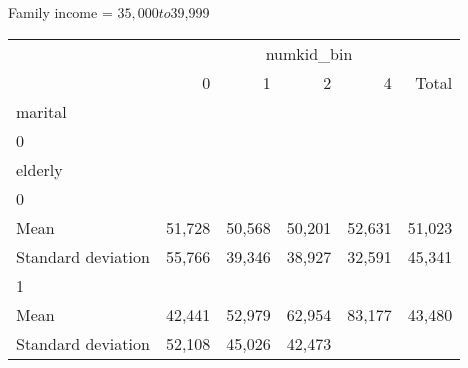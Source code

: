 Family income = $35,000 to $39,999
\begin{tabular}{llllll}
\cline{1-6}
\multicolumn{1}{c}{} &
  \multicolumn{5}{|c}{numkid\_bin} \\
\multicolumn{1}{c}{} &
  \multicolumn{1}{|r}{0} &
  \multicolumn{1}{r}{1} &
  \multicolumn{1}{r}{2} &
  \multicolumn{1}{r}{4} &
  \multicolumn{1}{r}{Total} \\
\cline{1-6}
\multicolumn{1}{l}{marital} &
  \multicolumn{1}{|r}{} &
  \multicolumn{1}{r}{} &
  \multicolumn{1}{r}{} &
  \multicolumn{1}{r}{} &
  \multicolumn{1}{r}{} \\
\multicolumn{1}{l}{\hspace{1em}0} &
  \multicolumn{1}{|r}{} &
  \multicolumn{1}{r}{} &
  \multicolumn{1}{r}{} &
  \multicolumn{1}{r}{} &
  \multicolumn{1}{r}{} \\
\multicolumn{1}{l}{\hspace{2em}elderly} &
  \multicolumn{1}{|r}{} &
  \multicolumn{1}{r}{} &
  \multicolumn{1}{r}{} &
  \multicolumn{1}{r}{} &
  \multicolumn{1}{r}{} \\
\multicolumn{1}{l}{\hspace{3em}0} &
  \multicolumn{1}{|r}{} &
  \multicolumn{1}{r}{} &
  \multicolumn{1}{r}{} &
  \multicolumn{1}{r}{} &
  \multicolumn{1}{r}{} \\
\multicolumn{1}{l}{\hspace{4em}Mean} &
  \multicolumn{1}{|r}{51,728} &
  \multicolumn{1}{r}{50,568} &
  \multicolumn{1}{r}{50,201} &
  \multicolumn{1}{r}{52,631} &
  \multicolumn{1}{r}{51,023} \\
\multicolumn{1}{l}{\hspace{4em}Standard deviation} &
  \multicolumn{1}{|r}{55,766} &
  \multicolumn{1}{r}{39,346} &
  \multicolumn{1}{r}{38,927} &
  \multicolumn{1}{r}{32,591} &
  \multicolumn{1}{r}{45,341} \\
\multicolumn{1}{l}{\hspace{3em}1} &
  \multicolumn{1}{|r}{} &
  \multicolumn{1}{r}{} &
  \multicolumn{1}{r}{} &
  \multicolumn{1}{r}{} &
  \multicolumn{1}{r}{} \\
\multicolumn{1}{l}{\hspace{4em}Mean} &
  \multicolumn{1}{|r}{42,441} &
  \multicolumn{1}{r}{52,979} &
  \multicolumn{1}{r}{62,954} &
  \multicolumn{1}{r}{83,177} &
  \multicolumn{1}{r}{43,480} \\
\multicolumn{1}{l}{\hspace{4em}Standard deviation} &
  \multicolumn{1}{|r}{52,108} &
  \multicolumn{1}{r}{45,026} &
  \multicolumn{1}{r}{42,473} &

\end{tabular}
